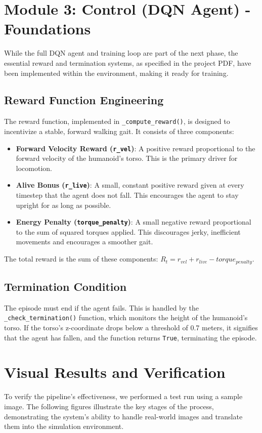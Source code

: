 \documentclass{article}
\begin{document}
\section{Module 3: Control (DQN Agent) - Foundations}
While the full DQN agent and training loop are part of the next phase, the essential reward and termination systems, as specified in the project PDF, have been implemented within the environment, making it ready for training.

\subsection{Reward Function Engineering}
The reward function, implemented in \texttt{\_compute_reward()}, is designed to incentivize a stable, forward walking gait. It consists of three components:
\begin{itemize}
    \item \textbf{Forward Velocity Reward (\texttt{r_vel})}: A positive reward proportional to the forward velocity of the humanoid's torso. This is the primary driver for locomotion.
    \item \textbf{Alive Bonus (\texttt{r_live})}: A small, constant positive reward given at every timestep that the agent does not fall. This encourages the agent to stay upright for as long as possible.
    \item \textbf{Energy Penalty (\texttt{torque_penalty})}: A small negative reward proportional to the sum of squared torques applied. This discourages jerky, inefficient movements and encourages a smoother gait.
\end{itemize}
The total reward is the sum of these components: \( R_t = r_{vel} + r_{live} - torque_{penalty} \).

\subsection{Termination Condition}
The episode must end if the agent fails. This is handled by the \texttt{\_check_termination()} function, which monitors the height of the humanoid's torso. If the torso's z-coordinate drops below a threshold of 0.7 meters, it signifies that the agent has fallen, and the function returns \texttt{True}, terminating the episode.

\section{Visual Results and Verification}
To verify the pipeline's effectiveness, we performed a test run using a sample image. The following figures illustrate the key stages of the process, demonstrating the system's ability to handle real-world images and translate them into the simulation environment.
\end{document}
